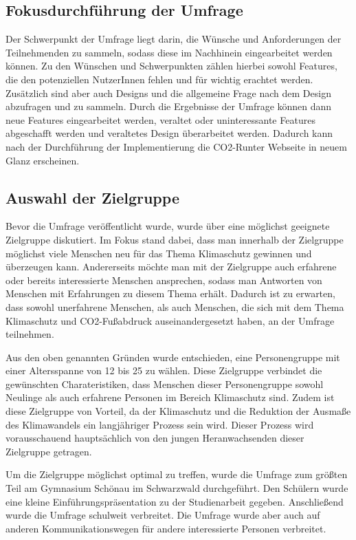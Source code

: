 \subsection{Fokusdurchführung der Umfrage}

Der Schwerpunkt der Umfrage liegt darin, die Wünsche und Anforderungen der Teilnehmenden zu sammeln, sodass diese im Nachhinein eingearbeitet werden können.
Zu den Wünschen und Schwerpunkten zählen hierbei sowohl Features, die den potenziellen NutzerInnen fehlen und für wichtig erachtet werden.
Zusätzlich sind aber auch Designs und die allgemeine Frage nach dem Design abzufragen und zu sammeln.
Durch die Ergebnisse der Umfrage können dann neue Features eingearbeitet werden, veraltet oder uninteressante Features abgeschafft werden und veraltetes Design überarbeitet werden.
Dadurch kann nach der Durchführung der Implementierung die CO2-Runter Webseite in neuem Glanz erscheinen.

\subsection{Auswahl der Zielgruppe}
\label{subsec:auswahl-der-zielgruppe}

Bevor die Umfrage veröffentlicht wurde, wurde über eine möglichst geeignete Zielgruppe diskutiert.
Im Fokus stand dabei, dass man innerhalb der Zielgruppe möglichst viele Menschen neu für das Thema Klimaschutz gewinnen und überzeugen kann.
Andererseits möchte man mit der Zielgruppe auch erfahrene oder bereits interessierte Menschen ansprechen, sodass man Antworten von Menschen mit Erfahrungen zu diesem Thema erhält.
Dadurch ist zu erwarten, dass sowohl unerfahrene Menschen, als auch Menschen, die sich mit dem Thema Klimaschutz und CO2-Fußabdruck auseinandergesetzt haben, an der Umfrage teilnehmen.

Aus den oben genannten Gründen wurde entschieden, eine Personengruppe mit einer Altersspanne von 12 bis 25 zu wählen.
Diese Zielgruppe verbindet die gewünschten Charateristiken, dass Menschen dieser Personengruppe sowohl Neulinge als auch erfahrene Personen im Bereich Klimaschutz sind.
Zudem ist diese Zielgruppe von Vorteil, da der Klimaschutz und die Reduktion der Ausmaße des Klimawandels ein langjähriger Prozess sein wird.
Dieser Prozess wird vorausschauend hauptsächlich von den jungen Heranwachsenden dieser Zielgruppe getragen.

Um die Zielgruppe möglichst optimal zu treffen, wurde die Umfrage zum größten Teil am Gymnasium Schönau im Schwarzwald durchgeführt.
Den Schülern wurde eine kleine Einführungspräsentation zu der Studienarbeit gegeben.
Anschließend wurde die Umfrage schulweit verbreitet.
Die Umfrage wurde aber auch auf anderen Kommunikationswegen für andere interessierte Personen verbreitet.

